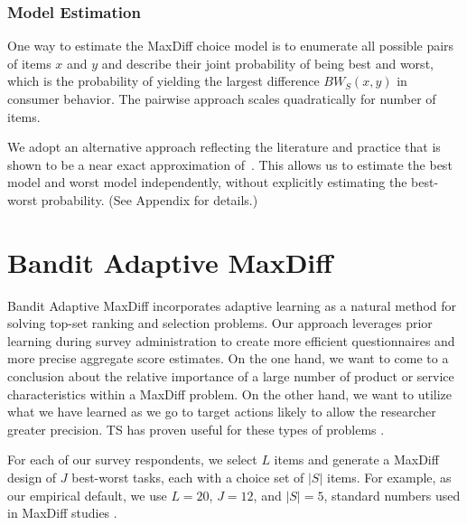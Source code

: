 \documentclass[a4paper,11pt]{article}
\newcommand{\numperset}{L}
\begin{document}
\subsubsection{Model Estimation}

One way to estimate the MaxDiff choice model is to enumerate all possible pairs of items $x$ and $y$ and describe their joint probability of being best and worst, which is the probability of yielding the largest difference $BW_S(x,y)$ in consumer behavior. The pairwise approach scales quadratically for number of items. 

We adopt an alternative approach reflecting the literature and practice that is shown to be a near exact approximation of~\cite{cohen2003maximum}. This allows us to estimate the best model and worst model independently, without explicitly estimating the best-worst probability.  (See Appendix for details.)


\section{Bandit Adaptive MaxDiff}


Bandit Adaptive MaxDiff incorporates adaptive learning as a natural method for solving top-set ranking and selection problems. Our approach leverages prior learning during survey administration to create more efficient questionnaires and more precise aggregate score estimates. On the one hand, we want to come to a conclusion about the relative importance of a large number of product or service characteristics within a MaxDiff problem. On the other hand, we want to utilize what we have learned as we go to target actions likely to allow the researcher greater precision. TS has proven useful for these types of problems \citep{schwartzetal2017,russo2017tutorial}.

For each of our survey respondents, we select $\numperset$ items and generate a MaxDiff design of $J$ best-worst tasks, each with a choice set of $|S|$ items. For example, as our empirical default, we use $\numperset=20$, $J=12$, and $|S|=5$, standard numbers used in MaxDiff studies \citep{wirth2012largeset}. 
\end{document}
